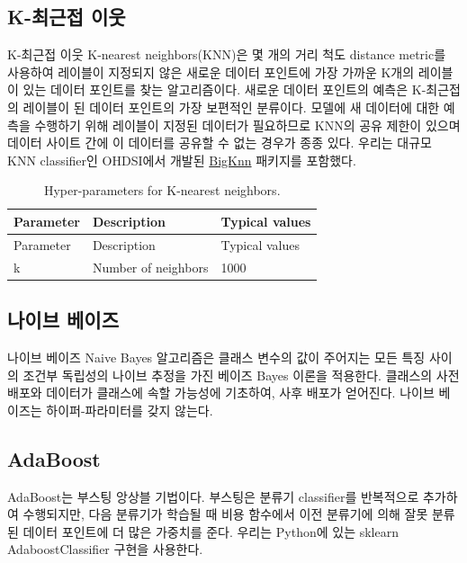 \documentclass[10.5pt]{book}
\theoremstyle{definition}
\theoremstyle{definition}
\theoremstyle{definition}
\theoremstyle{remark}
\begin{document}
\subsection{K-최근접 이웃}\label{k--}

K-최근접 이웃 K-nearest neighbors(KNN)은 몇 개의 거리 척도 distance
metric를 사용하여 레이블이 지정되지 않은 새로운 데이터 포인트에 가장
가까운 K개의 레이블이 있는 데이터 포인트를 찾는 알고리즘이다. 새로운
데이터 포인트의 예측은 K-최근접의 레이블이 된 데이터 포인트의 가장
보편적인 분류이다. 모델에 새 데이터에 대한 예측을 수행하기 위해 레이블이
지정된 데이터가 필요하므로 KNN의 공유 제한이 있으며 데이터 사이트 간에
이 데이터를 공유할 수 없는 경우가 종종 있다. 우리는 대규모 KNN
classifier인 OHDSI에서 개발된
\href{https://github.com/OHDSI/BigKnn}{BigKnn} 패키지를 포함했다.
 

\begin{longtable}[]{@{}lll@{}}
\caption{\label{tab:knnParameters} Hyper-parameters for K-nearest
neighbors.}\tabularnewline
\toprule
Parameter & Description & Typical values\tabularnewline
\midrule
\endfirsthead
\toprule
Parameter & Description & Typical values\tabularnewline
\midrule
\endhead
k & Number of neighbors & 1000\tabularnewline
\bottomrule
\end{longtable}

\subsection{나이브 베이즈}\label{-}

나이브 베이즈 Naive Bayes 알고리즘은 클래스 변수의 값이 주어지는 모든
특징 사이의 조건부 독립성의 나이브 추정을 가진 베이즈 Bayes 이론을
적용한다. 클래스의 사전 배포와 데이터가 클래스에 속할 가능성에 기초하여,
사후 배포가 얻어진다. 나이브 베이즈는 하이퍼-파라미터를 갖지 않는다.

\subsection{AdaBoost}\label{adaboost}

AdaBoost는 부스팅 앙상블 기법이다. 부스팅은 분류기 classifier를
반복적으로 추가하여 수행되지만, 다음 분류기가 학습될 때 비용 함수에서
이전 분류기에 의해 잘못 분류된 데이터 포인트에 더 많은 가중치를 준다.
우리는 Python에 있는 sklearn AdaboostClassifier 구현을 사용한다.
 
\end{document}
